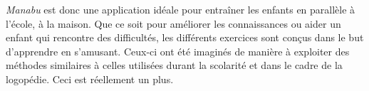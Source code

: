 \textit{Manabu} est donc une application idéale pour entraîner les enfants en parallèle à l'école, à la maison. Que ce soit pour améliorer les connaissances ou aider un enfant qui rencontre des difficultés, les différents exercices sont conçus dans le but d'apprendre en s'amusant. Ceux-ci ont été imaginés de manière à exploiter des méthodes similaires à celles utilisées durant la scolarité et dans le cadre de la logopédie. Ceci est réellement un plus.



